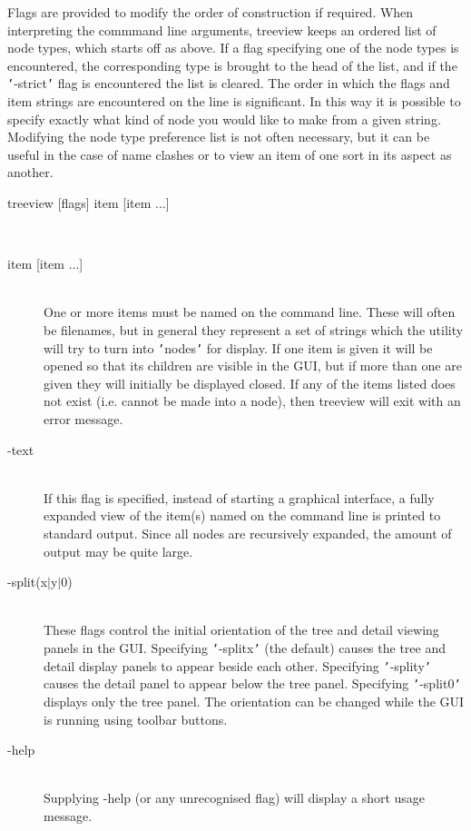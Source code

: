 \documentclass[twoside,11pt]{article}
\renewcommand{\_}{\texttt{\symbol{95}}}
\newcommand{\sstusage}[1]{\item[Usage:] \mbox{}
   \begin{description}
      {\ssttt \item #1}
   \end{description}
}
\newcommand{\sstparameters}[1]{
   \item[Parameters:] \mbox{} \\
   \vspace{-3.5ex}
   \begin{description}
      #1
   \end{description}
}
\newcommand{\sstsubsection}[1]{ \item[{#1}] \mbox{} \\}
\newcommand{\sstusage}[1]{\item[Usage:]
      \begin{description}
         {\ssttt #1}
      \end{description}
      \\
   }
\newcommand{\sstparameters}[1]{
      \item[Parameters:] \\
      \begin{description}
         #1
      \end{description}
      \\
   }
\newcommand{\sstsubsection}[1]{\item[{#1}]}
\begin{document}
{{      Flags are provided to modify the order of construction if required.
      When interpreting the commmand line arguments, treeview keeps
      an ordered list of node types, which starts off as above.
      If a flag specifying one of the node types is encountered, the
      corresponding type is brought to the head of the list, and
      if the {\tt '}-strict{\tt '} flag is encountered the list is cleared.
      The order in which the flags and item strings are encountered on the
      line is significant.  In this way it is possible to specify exactly
      what kind of node you would like to make from a given string.
      Modifying the node type preference list is not often necessary,
      but it can be useful in the case of name clashes or to view an
      item of one sort in its aspect as another.
   }
   \sstusage{
      treeview [flags] item [item ...]
   }
   \sstparameters{
      \sstsubsection{
         item [item ...]
      }{
         One or more items must be named on the command line.  These
         will often be filenames, but in general they represent a set
         of strings which the utility will try to turn into {\tt '}nodes{\tt '}
         for display.  If one item is given it will be opened so that
         its children are visible in the GUI, but if more than one
         are given they will initially be displayed closed.
         If any of the items listed does not exist (i.e. cannot be
         made into a node), then treeview will exit with an error
         message.
      }
      \sstsubsection{
         -text
      }{
         If this flag is specified, instead of starting a graphical
         interface, a fully expanded view of the item(s) named on
         the command line is printed to standard output.  Since all
         nodes are recursively expanded, the amount of output may
         be quite large.
      }
      \sstsubsection{
         -split(x$|$y$|$0)
      }{
         These flags control the initial orientation of the tree and
         detail viewing panels in the GUI.  Specifying {\tt '}-splitx{\tt '}
         (the default) causes the tree and detail display panels to
         appear beside each other.  Specifying {\tt '}-splity{\tt '} causes the
         detail panel to appear below the tree panel.  Specifying
         {\tt '}-split0{\tt '} displays only the tree panel.  The orientation can
         be changed while the GUI is running using toolbar buttons.
      }
      \sstsubsection{
         -help
      }{
         Supplying -help (or any unrecognised flag) will display a short
         usage message.
}}}
\end{document}

